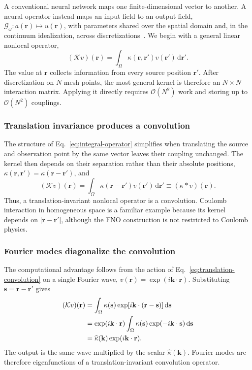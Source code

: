\documentclass[11pt]{article}
\begin{document}
A conventional neural network maps one finite-dimensional vector to another.
A neural operator instead maps an input field to an output field,
\(
 \mathcal G_\omega:a(\mathbf r)\mapsto u(\mathbf r)
\), with parameters shared over the spatial domain and, in the continuum
idealization, across discretizations~\citep{kovachki2023neuraloperator}. We
begin with a general linear nonlocal operator,
\begin{equation}
 (\mathcal K v)(\mathbf r)
 =\int_\Omega
 \kappa(\mathbf r,\mathbf r')v(\mathbf r')\,\mathrm d\mathbf r'.
 \label{eq:integral-operator}
\end{equation}
The value at \(\mathbf r\) collects information from every source position
\(\mathbf r'\). After discretization on \(N\) mesh points, the most general
kernel is therefore an \(N\times N\) interaction matrix. Applying it directly
requires \(\mathcal O(N^2)\) work and storing up to \(\mathcal O(N^2)\)
couplings.

\subsubsection{Translation invariance produces a convolution}

The structure of Eq.~\eqref{eq:integral-operator} simplifies when translating
the source and observation point by the same vector leaves their coupling
unchanged. The kernel then depends on their separation rather than their
absolute positions,
\(
 \kappa(\mathbf r,\mathbf r')=\kappa(\mathbf r-\mathbf r')
\), and
\begin{equation}
 (\mathcal K v)(\mathbf r)
 =\int_\Omega \kappa(\mathbf r-\mathbf r')v(\mathbf r')\,\mathrm d\mathbf r'
 \equiv (\kappa*v)(\mathbf r).
 \label{eq:translation-convolution}
\end{equation}
Thus, a translation-invariant nonlocal operator is a convolution. Coulomb
interaction in homogeneous space is a familiar example because its kernel
depends on \(|\mathbf r-\mathbf r'|\), although the FNO construction is not
restricted to Coulomb physics.

\subsubsection{Fourier modes diagonalize the convolution}

The computational advantage follows from the action of
Eq.~\eqref{eq:translation-convolution} on a single Fourier wave,
\(v(\mathbf r)=\exp(i\mathbf k\cdot\mathbf r)\). Substituting
\(\mathbf s=\mathbf r-\mathbf r'\) gives
\begin{align}
 (\mathcal K v)(\mathbf r)
 &=\int_\Omega \kappa(\mathbf s)
   \exp[i\mathbf k\cdot(\mathbf r-\mathbf s)]\,\mathrm d\mathbf s \notag\\
 &=\exp(i\mathbf k\cdot\mathbf r)
   \int_\Omega \kappa(\mathbf s)
   \exp(-i\mathbf k\cdot\mathbf s)\,\mathrm d\mathbf s \notag\\
 &=\widehat\kappa(\mathbf k)\exp(i\mathbf k\cdot\mathbf r).
 \label{eq:fourier-eigenfunction}
\end{align}
The output is the same wave multiplied by the scalar
\(\widehat\kappa(\mathbf k)\). Fourier modes are therefore eigenfunctions of a
translation-invariant convolution operator.
\end{document}
